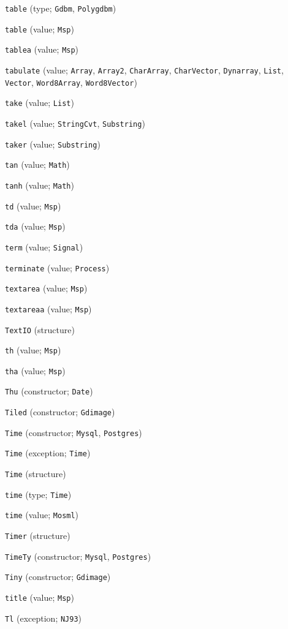 \begin{description}
\item[] \verb"table" (type; \verb"Gdbm", \verb"Polygdbm")
\item[] \verb"table" (value; \verb"Msp")
\item[] \verb"tablea" (value; \verb"Msp")
\item[] \verb"tabulate" (value; \verb"Array", \verb"Array2", \verb"CharArray", \verb"CharVector", \verb"Dynarray", \verb"List", \verb"Vector", \verb"Word8Array", \verb"Word8Vector")
\item[] \verb"take" (value; \verb"List")
\item[] \verb"takel" (value; \verb"StringCvt", \verb"Substring")
\item[] \verb"taker" (value; \verb"Substring")
\item[] \verb"tan" (value; \verb"Math")
\item[] \verb"tanh" (value; \verb"Math")
\item[] \verb"td" (value; \verb"Msp")
\item[] \verb"tda" (value; \verb"Msp")
\item[] \verb"term" (value; \verb"Signal")
\item[] \verb"terminate" (value; \verb"Process")
\item[] \verb"textarea" (value; \verb"Msp")
\item[] \verb"textareaa" (value; \verb"Msp")
\item[] \verb"TextIO" (structure)
\item[] \verb"th" (value; \verb"Msp")
\item[] \verb"tha" (value; \verb"Msp")
\item[] \verb"Thu" (constructor; \verb"Date")
\item[] \verb"Tiled" (constructor; \verb"Gdimage")
\item[] \verb"Time" (constructor; \verb"Mysql", \verb"Postgres")
\item[] \verb"Time" (exception; \verb"Time")
\item[] \verb"Time" (structure)
\item[] \verb"time" (type; \verb"Time")
\item[] \verb"time" (value; \verb"Mosml")
\item[] \verb"Timer" (structure)
\item[] \verb"TimeTy" (constructor; \verb"Mysql", \verb"Postgres")
\item[] \verb"Tiny" (constructor; \verb"Gdimage")
\item[] \verb"title" (value; \verb"Msp")
\item[] \verb"Tl" (exception; \verb"NJ93")

\end{description}
